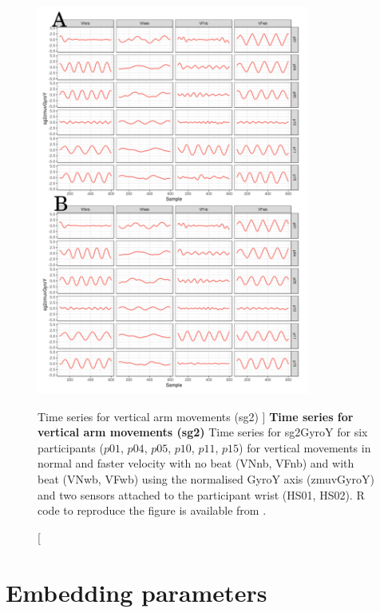 \begin{figure}
\centering
\includegraphics[width=0.8\textwidth]{tssg2gyroY}
	\caption
	[Time series for vertical arm movements (sg2) ]{
	{\bf Time series for vertical arm movements (sg2)}
		Time series for sg2GyroY for six participants 
		($p01$, $p04$, $p05$, $p10$, $p11$, $p15$) 
		for vertical movements in normal and faster velocity with
		no beat	(VNnb, VFnb) and with beat (VNwb, VFwb) using 
		the normalised GyroY axis (zmuvGyroY) and 
		two sensors attached to the participant wrist (HS01, HS02).
	R code to reproduce the figure is available from \cite{hwum2018}.
	}
    \label{fig:tssg2gyroY-hii}
\end{figure}







\newpage
\section{Embedding parameters} \label{appendix:d:ep}
